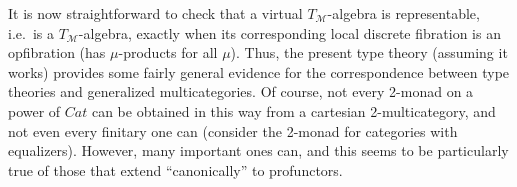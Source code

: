 \documentclass{amsart}
\theoremstyle{definition}
\def\M{\mathcal{M}}
\begin{document}
It is now straightforward to check that a virtual $T_\M$-algebra is representable, i.e.\ is a $T_\M$-algebra, exactly when its corresponding local discrete fibration is an opfibration (has $\mu$-products for all $\mu$).
Thus, the present type theory (assuming it works) provides some fairly general evidence for the correspondence between type theories and generalized multicategories.
Of course, not every 2-monad on a power of $\mathit{Cat}$ can be obtained in this way from a cartesian 2-multicategory, and not even every finitary one can (consider the 2-monad for categories with equalizers).
However, many important ones can, and this seems to be particularly true of those that extend ``canonically'' to profunctors.
\end{document}
